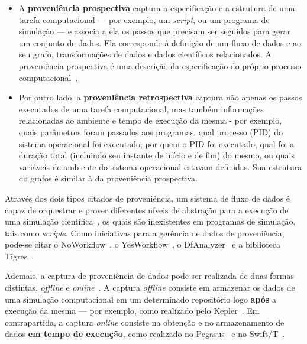 \begin{itemize}
    \item A \textbf{proveniência prospectiva} captura a especificação e a estrutura de uma tarefa computacional --- por exemplo, um \textit{script}, ou um programa de simulação --- e associa a ela os passos que precisam ser seguidos para gerar um conjunto de dados. Ela corresponde à definição de um fluxo de dados e ao seu grafo, transformações de dados e dados científicos relacionados. A proveniência prospectiva é uma descrição da especificação do próprio processo computacional~\cite{mcphillips2015yesworkflow}.
    \item Por outro lado, a \textbf{proveniência retrospectiva} captura não apenas os passos executados de uma tarefa computacional, mas também informações relacionadas ao ambiente e tempo de execução da mesma - por exemplo, quais parâmetros foram passados aos programas, qual  processo (PID) do sistema operacional foi executado, por quem o PID foi executado, qual foi a duração total (incluindo seu instante de início e de fim) do mesmo, ou quais variáveis de ambiente do sistema operacional estavam definidas. Sua estrutura do grafos é similar à da proveniência prospectiva.
\end{itemize}

Através dos dois tipos citados de proveniência, um sistema de fluxo de dados é capaz de orquestrar e prover diferentes níveis de abstração para a execução de uma simulação científica~\cite{murta2014noworkflow}, os quais são inexistentes em programas de simulação, tais como \textit{scripts}. Como iniciativas para a gerência de dados de proveniência, pode-se citar o NoWorkflow~\cite{murta2014noworkflow}, o YesWorkflow~\cite{mcphillips2015yesworkflow}, o DfAnalyzer~\cite{silva2016situ} e a biblioteca Tigres~\cite{hendrix2016tigres}.

Ademais, a captura de proveniência de dados pode ser realizada de duas formas distintas, \textit{offline} e \textit{online}~\cite{silva2015propostadoutorado}. A captura \textit{offline} consiste em armazenar os dados de uma simulação computacional em um determinado repositório logo \textbf{após} a execução da mesma --- por exemplo, como realizado pelo Kepler~\cite{ludascher2006scientific}. Em contrapartida, a captura \textit{online} consiste na obtenção e no armazenamento de dados \textbf{em tempo de execução}, como realizado no Pegasus~\cite{deelman2005pegasus} e no Swift/T~\cite{zhao2007swift}.

